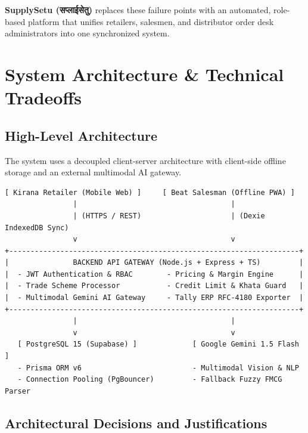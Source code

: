 \documentclass[11pt,a4paper]{article}
\begin{document}
\noindent\textbf{SupplySetu (सप्लाईसेतु)} replaces these failure points with an automated, role-based platform that unifies retailers, salesmen, and distributor order desk administrators into one synchronized system.

\section{System Architecture \& Technical Tradeoffs}

\subsection{High-Level Architecture}
The system uses a decoupled client-server architecture with client-side offline storage and an external multimodal AI gateway.

\begin{center}
\begin{tcolorbox}[colback=codebg,colframe=bordercolor,arc=1mm,title=\textbf{System Topography}]
\begin{verbatim}
[ Kirana Retailer (Mobile Web) ]     [ Beat Salesman (Offline PWA) ]
                |                                    |
                | (HTTPS / REST)                     | (Dexie IndexedDB Sync)
                v                                    v
+--------------------------------------------------------------------+
|               BACKEND API GATEWAY (Node.js + Express + TS)         |
|  - JWT Authentication & RBAC        - Pricing & Margin Engine      |
|  - Trade Scheme Processor           - Credit Limit & Khata Guard   |
|  - Multimodal Gemini AI Gateway     - Tally ERP RFC-4180 Exporter  |
+--------------------------------------------------------------------+
                |                                    |
                v                                    v
   [ PostgreSQL 15 (Supabase) ]             [ Google Gemini 1.5 Flash ]
   - Prisma ORM v6                          - Multimodal Vision & NLP
   - Connection Pooling (PgBouncer)         - Fallback Fuzzy FMCG Parser
\end{verbatim}
\end{tcolorbox}
\end{center}

\subsection{Architectural Decisions and Justifications}
\end{document}
